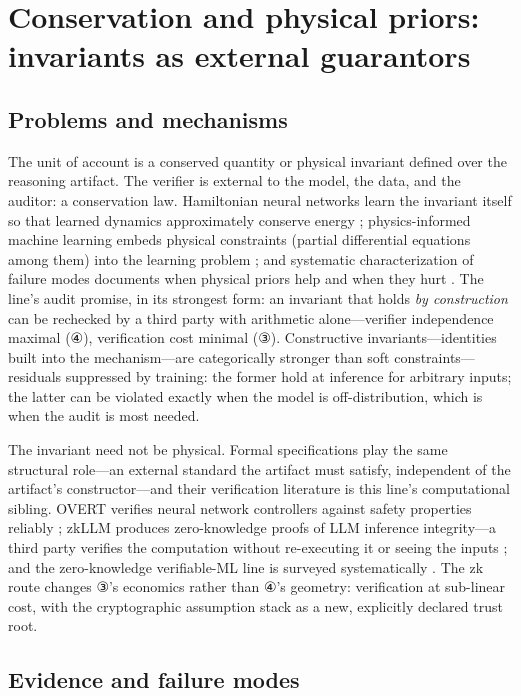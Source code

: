 \documentclass[11pt,a4paper]{article}
\begin{document}
\section{Conservation and physical priors: invariants as external guarantors}

\subsection{Problems and mechanisms}

The unit of account is a conserved quantity or physical invariant defined over the reasoning artifact. The verifier is external to the model, the data, and the auditor: a conservation law. Hamiltonian neural networks learn the invariant itself so that learned dynamics approximately conserve energy \cite{key11}; physics-informed machine learning embeds physical constraints (partial differential equations among them) into the learning problem \cite{key12}; and systematic characterization of failure modes documents when physical priors help and when they hurt \cite{key13}. The line's audit promise, in its strongest form: an invariant that holds \textit{by construction} can be rechecked by a third party with arithmetic alone—verifier independence maximal (④), verification cost minimal (③). Constructive invariants—identities built into the mechanism—are categorically stronger than soft constraints—residuals suppressed by training: the former hold at inference for arbitrary inputs; the latter can be violated exactly when the model is off-distribution, which is when the audit is most needed.

The invariant need not be physical. Formal specifications play the same structural role—an external standard the artifact must satisfy, independent of the artifact's constructor—and their verification literature is this line's computational sibling. OVERT verifies neural network controllers against safety properties reliably \cite{key46}; zkLLM produces zero-knowledge proofs of LLM inference integrity—a third party verifies the computation without re-executing it or seeing the inputs \cite{key47}; and the zero-knowledge verifiable-ML line is surveyed systematically \cite{key48}. The zk route changes ③'s economics rather than ④'s geometry: verification at sub-linear cost, with the cryptographic assumption stack as a new, explicitly declared trust root.

\subsection{Evidence and failure modes}
\end{document}
